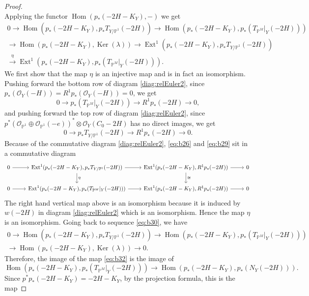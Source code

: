 \documentclass[11pt,twoside]{amsart}
\theoremstyle{plain}
\theoremstyle{definition}
\newcommand{\PP}{\mathbb{P}}
\newcommand{\PM}{\mathbb{P}^M}
\newcommand{\OO}{\mathcal{O}}
\newcommand{\Hom}{\operatorname{Hom}}
\newcommand{\Ext}{\operatorname{Ext}}
\newcommand{\NY}{N_{Y}}
\newcommand{\TP}{T_{\PM}|_Y}
\begin{document}
\begin{proof}
\[\]
Applying the functor $\Hom(p_*(-2H-K_Y),-)$ we get
\begin{multline}\label{eq:b30}
0\to\Hom(p_*(-2H-K_Y),p_*T_{Y/\PP^1}(-2H))\to\Hom(p_*(-2H-K_Y),p_*(\TP(-2H)))\\
\to\Hom(p_*(-2H-K_Y),\operatorname{Ker}(\lambda))\to\Ext^1(p_*(-2H-K_Y),p_*T_{Y/\PP^1}(-2H))\\
\xrightarrow{\ \eta\ }\Ext^1(p_*(-2H-K_Y),p_*(\TP(-2H))) .
\end{multline}
We first show that the map $\eta$ is an injective map and is in fact an isomorphism. Pushing forward the bottom row of diagram \eqref{diag:relEuler2}, since $p_*(\OO_Y(-H))=R^1p_*(\OO_Y(-H))=0$, we get
\begin{equation}\label{eq:b26}
0\to p_*(\TP(-2H))\to R^1p_*(-2H)\to0 ,
\end{equation}
and pushing forward the top row of diagram \eqref{diag:relEuler2}, since $p^*(\OO_{\PP^1}\oplus\OO_{\PP^1}(-e))^*\otimes\OO_Y(C_0-2H)$ has no direct images, we get
\begin{equation}\label{eq:b29}
0\to p_*T_{Y/\PP^1}(-2H)\to R^1p_*(-2H)\to0 .
\end{equation}
Because of the commutative diagram \eqref{diag:relEuler2}, \eqref{eq:b26} and \eqref{eq:b29} sit in a commutative diagram
\[
\begin{tikzcd}
0 \arrow[r] & \Ext^1(p_*(-2H-K_Y), p_*T_{Y/\PP^1}(-2H)) \arrow[d, "\eta"] \arrow[r] & \Ext^1(p_*(-2H-K_Y), R^1p_*(-2H)) \arrow[r] \arrow[d, "\cong"] & 0 \\
0 \arrow[r] & \Ext^1(p_*(-2H-K_Y), p_*(\TP(-2H))) \arrow[r] & \Ext^1(p_*(-2H-K_Y), R^1p_*(-2H)) \arrow[r] & 0
\end{tikzcd}
\]
The right hand vertical map above is an isomorphism because it is induced by $w(-2H)$ in diagram \eqref{diag:relEuler2} which is an isomorphism. Hence the map $\eta$ is an isomorphism. Going back to sequence \eqref{eq:b30}, we have
\begin{multline}\label{eq:b31}
0\to\Hom(p_*(-2H-K_Y),p_*T_{Y/\PP^1}(-2H))\to\Hom(p_*(-2H-K_Y),p_*(\TP(-2H)))\\
\to\Hom(p_*(-2H-K_Y),\operatorname{Ker}(\lambda))\to0 .
\end{multline}
Therefore, the image of the map \eqref{eq:b32} is the image of
\begin{equation}\label{eq:b33}
\Hom(p_*(-2H-K_Y),p_*(\TP(-2H)))\to\Hom(p_*(-2H-K_Y),p_*(\NY(-2H))) .
\end{equation}
Since $p^*p_*(-2H-K_Y)=-2H-K_Y$, by the projection formula, this is the map

\end{proof}
\end{document}
